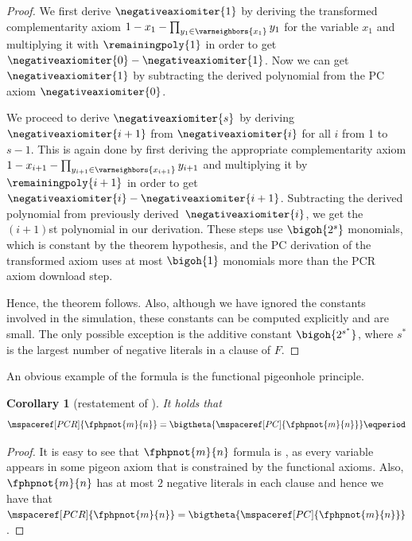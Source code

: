 \documentclass[11pt]{article}
\numberwithin{equation}{section}
\newtheorem{corollary}[theorem]{Corollary}
\theoremstyle{definition}
\theoremstyle{plain}
\begin{document}
\begin{proof}
  We first derive $\negativeaxiomiter{1}$ by deriving the transformed
  complementarity axiom $1 - x_1 - \prod_{y_1 \in \varneighbors{x_1}}
  y_1$ for the variable $x_1$ and multiplying it with
  $\remainingpoly{1}$ in order to get
  $\negativeaxiomiter{0} - \negativeaxiomiter{1}$. Now we can get
  $\negativeaxiomiter{1}$ by subtracting the derived polynomial from
  the PC axiom $\negativeaxiomiter{0}$.


  We proceed to derive $\negativeaxiomiter{s}$ by deriving
  $\negativeaxiomiter{i + 1}$ from $\negativeaxiomiter{i}$ for all $i$
  from 1 to $s - 1$. This is again done by first deriving the
  appropriate complementarity axiom $1 - x_{i + 1} - \prod_{y_{i + 1}
    \in \varneighbors{x_{i + 1}}} y_{i + 1}$ and multiplying it by
  $\remainingpoly{i + 1}$ in order to get
  $\negativeaxiomiter{i} - \negativeaxiomiter{i + 1}$. Subtracting the
  derived polynomial from previously derived~$\negativeaxiomiter{i}$,
  we get the $(i + 1)$st polynomial in our derivation. These steps use
  $\bigoh{2^{s}}$ monomials, which is constant by the theorem hypothesis,
  and the PC derivation of the transformed axiom uses at most
  $\bigoh{1}$ monomials more than the PCR axiom download step.

  Hence, the theorem follows. Also, although we have ignored the
  constants involved in the simulation, these constants can be
  computed explicitly and are small. The only possible exception is
  the additive constant $\bigoh{2^{s^{*}}}$, where $s^{*}$ is the
  largest number of negative literals in a clause of $F$.
\end{proof}

An obvious example of the \varweightconstrained{} formula is the
functional pigeonhole principle.

\begin{corollary}[restatement %
  of ]\label{cor:fphppcequalpcrspace}
  It holds that
  \begin{equation*}
    \mspaceref[PCR]{\fphpnot{m}{n}} = \bigtheta{\mspaceref[PC]{\fphpnot{m}{n}}} \eqperiod
  \end{equation*}
\end{corollary}
\begin{proof}
  It is easy to see that $\fphpnot{m}{n}$ formula is
  \varweightconstrained{}, as every variable appears in some pigeon
  axiom that is constrained by the functional axioms. Also,
  $\fphpnot{m}{n}$ has at most $2$ negative literals in each clause
  and hence we have that $\mspaceref[PCR]{\fphpnot{m}{n}} =
  \bigtheta{\mspaceref[PC]{\fphpnot{m}{n}}}$.
\end{proof}
\end{document}
